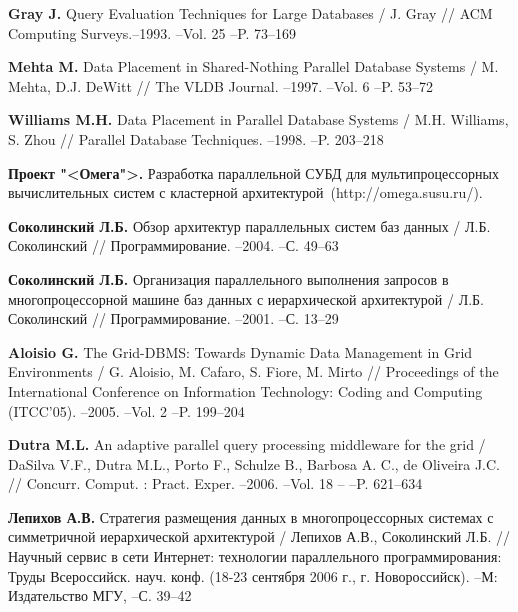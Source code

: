 \documentclass[11pt,oneside]{article}
\begin{document}
\begin{thebibliography}{X}
 {\bf Gray J.} {\sf Query Evaluation Techniques for Large Databases} / J. Gray // ACM Computing Surveys.--1993. --Vol. 25  --P. 73--169\vspace{-2mm}

 {\bf Mehta M.} {\sf Data Placement in Shared-Nothing Parallel Database Systems} / M. Mehta, D.J. DeWitt // The VLDB Journal. --1997. --Vol. 6  --P. 53--72\vspace{-2mm}

 {\bf Williams M.H.} {\sf Data Placement in Parallel Database Systems} / M.H. Williams, S. Zhou // Parallel Database Techniques. --1998. --P. 203--218\vspace{-2mm}

 {\bf Проект "<Омега">.} {\sf  Разработка параллельной СУБД для мультипроцессорных вычислительных систем с кластерной архитектурой}\ (http://omega.susu.ru/).

 {\bf Соколинский Л.Б.} {\sf Обзор архитектур параллельных систем баз данных} / Л.Б. Соколинский // Программирование. --2004.  --С. 49--63\vspace{-2mm}

 {\bf Соколинский Л.Б.} {\sf Организация параллельного выполнения запросов в многопроцессорной машине баз данных с иерархической архитектурой} / Л.Б. Соколинский // Программирование. --2001.  --С. 13--29\vspace{-2mm}

 {\bf Aloisio G.} {\sf The Grid-DBMS: Towards Dynamic Data Management in Grid Environments} / G. Aloisio, M. Cafaro, S. Fiore, M. Mirto // Proceedings of the International Conference on Information Technology: Coding and Computing (ITCC'05). --2005. --Vol. 2 --P. 199--204\vspace{-2mm}

 {\bf Dutra M.L.} {\sf An adaptive parallel query processing middleware for the grid} / DaSilva V.F., Dutra M.L., Porto F., Schulze B., Barbosa A. C., de Oliveira J.C. // Concurr. Comput. : Pract. Exper. --2006. --Vol. 18 -- --P. 621--634\vspace{-2mm}

 {\bf Лепихов А.В.} {\sf Стратегия размещения данных в многопроцессорных системах с симметричной иерархической архитектурой} / Лепихов А.В., Соколинский Л.Б. // Научный сервис в сети Интернет: технологии параллельного программирования: Труды Всероссийск. науч. конф. (18-23 сентября 2006 г., г. Новороссийск). --М: Издательство МГУ, --С. 39--42\vspace{-2mm}


\end{thebibliography}
\end{document}
